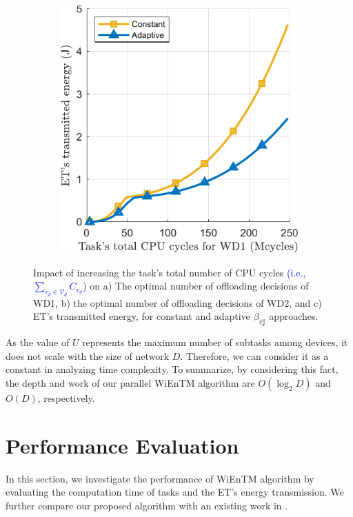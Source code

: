 \documentclass[12pt,draftclsnofoot,onecolumn]{IEEEtran}
\begin{document}
\begin{figure}[ht]
\begin{subfigure}[b]{.22\textwidth}
		\caption{} \label{fig:6b}
	\end{subfigure}\hspace{15mm}
	\begin{subfigure}[b]{.22\textwidth}
		\centering
		\includegraphics[width=\linewidth]{simulation_c.pdf}
		\caption{} \label{fig:6c}
	\end{subfigure}
	
	\caption{Impact of increasing the task's total number of CPU cycles \textcolor{blue}{(i.e., $\sum_{v_d\in\mathcal{V}_d}C_{v_d}$)} on a) The optimal number of offloading decisions of WD1, b) the optimal number of offloading decisions of WD2, and c) ET's transmitted energy, for constant and adaptive $\beta_{v_d^u}$ approaches.} \label{fig:6}
\end{figure}

As the value of $U$ represents the maximum number of subtasks among devices, it does not scale with the size of network $D$. Therefore, we can consider it as a constant in analyzing time complexity. To summarize, by considering this fact, the depth and work of our parallel WiEnTM algorithm are $O(\log_2D)$ and $O(D)$, respectively.

\section{Performance Evaluation}
In this section, we investigate the performance of WiEnTM algorithm by evaluating the computation time of tasks and the ET's energy transmission. We further compare our proposed algorithm with an existing work in \cite{b13}.
\end{document}
